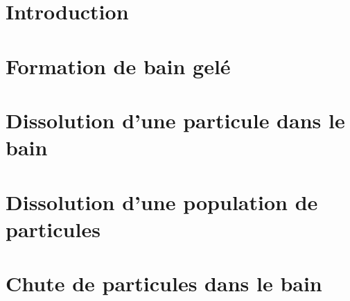 \section{Introduction}
\label{sec:particle-introduction}


\section{Formation de bain gelé}
\label{sec:particle-freeze}


\section{Dissolution d'une particule dans le bain}
\label{sec:particle-dissolution}


\section{Dissolution d'une population de particules}
\label{sec:particle-population-dissolution}


\section{Chute de particules dans le bain}
\label{sec:particle-fall}

